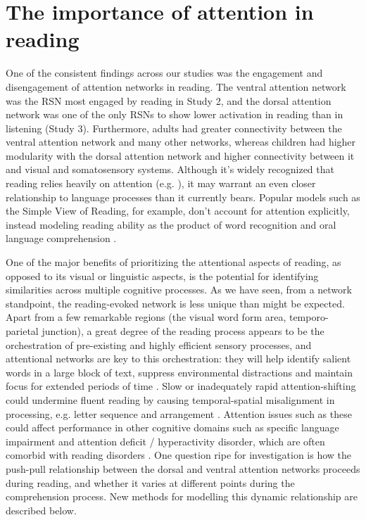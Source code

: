 \section{The importance of attention in reading}

One of the consistent findings across our studies was the engagement and disengagement of attention networks in reading. The ventral attention network was the RSN most engaged by reading in Study 2, and the dorsal attention network was one of the only RSNs to show lower activation in reading than in listening (Study 3). Furthermore, adults had greater connectivity between the ventral attention network and many other networks, whereas children had higher modularity with the dorsal attention network and higher connectivity between it and visual and somatosensory systems. Although it's widely recognized that reading relies heavily on attention (e.g. \cite{Vogel2012a, Vidyasagar2010, Clifton2016}), it may warrant an even closer relationship to language processes than it currently bears. Popular models such as the Simple View of Reading, for example, don't account for attention explicitly, instead modeling reading ability as the product of word recognition and oral language comprehension \citep{Gough1986}. 

One of the major benefits of prioritizing the attentional aspects of reading, as opposed to its visual or linguistic aspects, is the potential for identifying similarities across multiple cognitive processes. As we have seen, from a network standpoint, the reading-evoked network is less unique than might be expected. Apart from a few remarkable regions (the visual word form area, temporo-parietal junction), a great degree of the reading process appears to be the orchestration of pre-existing and highly efficient sensory processes, and attentional networks are key to this orchestration: they will help identify salient words in a large block of text, suppress environmental distractions and maintain focus for extended periods of time \citep{Fedorenko2014}. Slow or inadequately rapid attention-shifting could undermine fluent reading by causing temporal-spatial misalignment in processing, e.g. letter sequence and arrangement \citep{Lallier2009}. Attention issues such as these could affect performance in other cognitive domains such as specific language impairment and attention deficit / hyperactivity disorder, which are often comorbid with reading disorders \citep{Pennington2006, Margari2013}. One question ripe for investigation is how the push-pull relationship between the dorsal and ventral attention networks proceeds during reading, and whether it varies at different points during the comprehension process. New methods for modelling this dynamic relationship are described below. 


